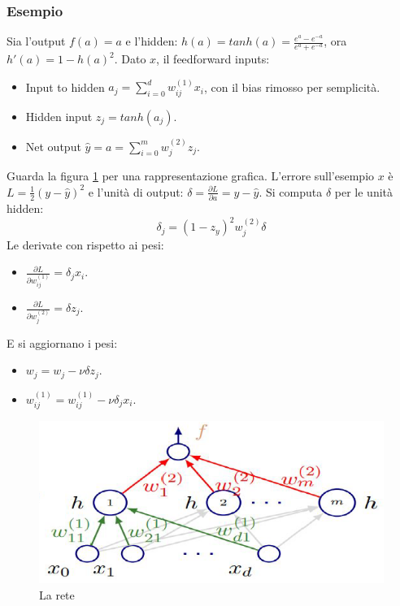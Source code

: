 		\subsubsection{Esempio}
		Sia l'output $f(a) = a$ e l'hidden: $h(a) = tanh(a) = \frac{e^a-e^{-a}}{e^a+e^{-a}}$, ora $h'(a) = 1-h(a)^2$.
		Dato $x$, il feedforward inputs:
		\begin{multicols}{2}
			\begin{itemize}
				\item Input to hidden $a_j = \sum\limits_{i = 0}^d w_{ij}^{(1)}x_i$, con il bias rimosso per semplicit\`a.
				\item Hidden input $z_j = tanh(a_j)$.
				\item Net output $\hat{y} = a = \sum\limits_{i = 0}^m w_j^{(2)} z_j$.
			\end{itemize}
		\end{multicols}
		Guarda la figura \ref{fig:chapter11-14} per una rappresentazione grafica.
		L'errore sull'esempio $x$ \`e $L= \frac{1}{2}(y-\hat{y})^2$ e l'unit\`a di output: $\delta = \frac{\partial L}{\partial a} = y - \hat{y}$.
		Si computa $\delta$ per le unit\`a hidden:
		$$\delta_j = (1-z_y)^2w_j^{(2)}\delta$$
		Le derivate con rispetto ai pesi:
		\begin{multicols}{2}
			\begin{itemize}
				\item $\frac{\partial L}{\partial w_{ij}^{(1)}} = \delta_jx_i$.
				\item $\frac{\partial L}{\partial w_j^{(2)}} = \delta z_j$.
			\end{itemize}
		\end{multicols}
		E si aggiornano i pesi:
		\begin{multicols}{2}
			\begin{itemize}
				\item $w_j = w_j - \nu \delta z_j$.
				\item $w_{ij}^{(1)} = w_{ij}^{(1)} - \nu \delta_jx_i$.
			\end{itemize}
		\end{multicols}
		\begin{figure}
			\centering
			\includegraphics[width=0.6\linewidth]{imgs/chapter11/img14}
			\caption{La rete}
			\label{fig:chapter11-14}
		\end{figure}
		
